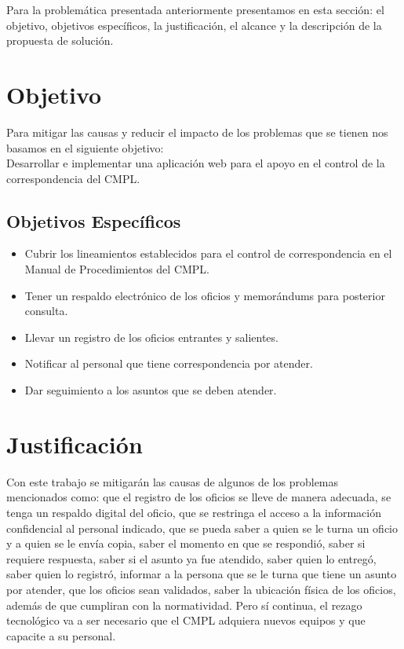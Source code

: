 Para la problemática presentada anteriormente presentamos en esta sección: el objetivo, objetivos específicos, la justificación, el alcance y la descripción de la propuesta de solución.\\


\section{Objetivo}

Para mitigar las causas y reducir el impacto de los problemas que se tienen nos basamos en el siguiente objetivo: \\

Desarrollar e implementar una aplicación web para el apoyo en el control de la correspondencia del CMPL. \\

\subsection{Objetivos Específicos}

\begin{itemize}
	\item Cubrir los lineamientos establecidos para el control de correspondencia en el Manual de Procedimientos del CMPL.
	\item Tener un respaldo electrónico de los oficios y memorándums para posterior consulta.
	\item Llevar un registro de los oficios entrantes y salientes.
	\item Notificar al personal que tiene correspondencia por atender.
	\item Dar seguimiento a los asuntos que se deben atender.
\end{itemize}

\section{Justificación}
Con este trabajo se mitigarán las causas de algunos de los problemas mencionados como: que el registro de los oficios se lleve de manera adecuada, se tenga un respaldo digital del oficio, que se restringa el acceso a la información confidencial al personal indicado, que se pueda saber a quien se le turna un oficio y a quien se le envía copia, saber el momento en que se respondió, saber si requiere respuesta, saber si el asunto ya fue atendido, saber quien lo entregó, saber quien lo registró, informar a la persona que se le turna que tiene un asunto por atender, que los oficios sean validados, saber la ubicación física de los oficios, además de que cumpliran con la normatividad. Pero sí continua, el rezago tecnológico va a ser necesario que el CMPL adquiera nuevos equipos y que capacite a su personal. \\

